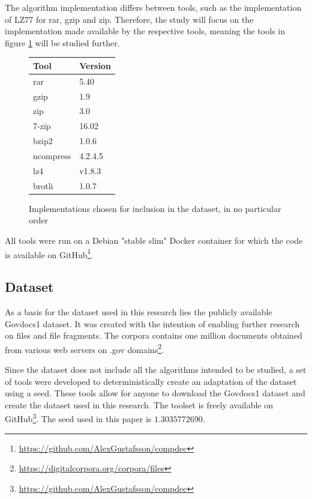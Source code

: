 \documentclass[conference]{IEEEtran}
\begin{document}
The algorithm implementation differs between tools, such as the implementation of LZ77 for rar, gzip and zip\cite{HORNEY2013}. Therefore, the study will focus on the implementation made available by the respective tools, meaning the tools in figure \ref{fig:method:algorithms2} will be studied 
further.

\begin{figure}[H]
    \centering
    \begin{tabular}{l|l}
        Tool & Version\\
        \hline
        rar & 5.40 \\
        gzip & 1.9 \\
        zip & 3.0 \\
        7-zip & 16.02 \\
        bzip2 & 1.0.6 \\
        ncompress & 4.2.4.5 \\
        lz4 & v1.8.3 \\
        brotli & 1.0.7
    \end{tabular}
    \caption{Implementations chosen for inclusion in the dataset, in no particular order}
    \label{fig:method:algorithms2}
\end{figure}

All tools were run on a Debian "stable slim" Docker container for which the code is available on GitHub\footnote{\href{https://github.com/AlexGustafsson/compdec}{https://github.com/AlexGustafsson/compdec}}.

\subsection{Dataset}
\label{method:dataset}

As a basis for the dataset used in this research lies the publicly available Govdocs1 dataset. It was created with the intention of enabling further research on files and file fragments. The corpora contains one million documents obtained from various web servers on .gov domains\footnote{\href{https://digitalcorpora.org/corpora/files}{https://digitalcorpora.org/corpora/files}}.

Since the dataset does not include all the algorithms intended to be studied, a set of tools were developed to deterministically create an adaptation of the dataset using a seed. These tools allow for anyone to download the Govdocs1 dataset and create the dataset used in this research. The toolset is freely available on GitHub\footnote{\href{https://github.com/AlexGustafsson/compdec}{https://github.com/AlexGustafsson/compdec}}. The seed used in this paper is $1.3035772690$.
\end{document}

